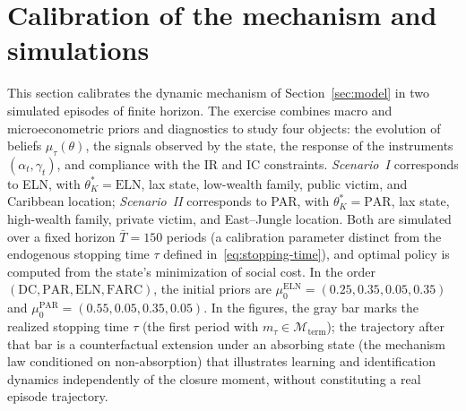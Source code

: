 \documentclass[review,authoryear,12pt]{elsarticle}
\theoremstyle{plain}
\theoremstyle{definition}
\newcommand{\1}{\mathbf{1}}
\begin{document}
\section{Calibration of the mechanism and simulations}\label{sec:calibracion}
\normalfont\normalsize
This section calibrates the dynamic mechanism of Section~\ref{sec:model} in two simulated episodes of finite horizon. The exercise combines macro and microeconometric priors and diagnostics to study four objects: the evolution of beliefs $\mu_\tau(\theta)$, the signals observed by the state, the response of the instruments $(\alpha_t,\gamma_t)$, and compliance with the IR and IC constraints. \emph{Scenario~I} corresponds to ELN, with $\theta_K^\ast=\mathrm{ELN}$, lax state, low-wealth family, public victim, and Caribbean location; \emph{Scenario~II} corresponds to PAR, with $\theta_K^\ast=\mathrm{PAR}$, lax state, high-wealth family, private victim, and East--Jungle location. Both are simulated over a fixed horizon $\bar{T}=150$ periods (a calibration parameter distinct from the endogenous stopping time $\tau$ defined in~\eqref{eq:stopping-time}), and optimal policy is computed from the state's minimization of social cost. In the order $(\mathrm{DC},\mathrm{PAR},\mathrm{ELN},\mathrm{FARC})$, the initial priors are $\mu_0^{\mathrm{ELN}}=(0.25,0.35,0.05,0.35)$ and $\mu_0^{\mathrm{PAR}}=(0.55,0.05,0.35,0.05)$. In the figures, the gray bar marks the realized stopping time $\tau$ (the first period with $m_\tau\in\mathcal{M}_{\mathrm{term}}$); the trajectory after that bar is a counterfactual extension under an absorbing state (the mechanism law conditioned on non-absorption) that illustrates learning and identification dynamics independently of the closure moment, without constituting a real episode trajectory.
\end{document}
